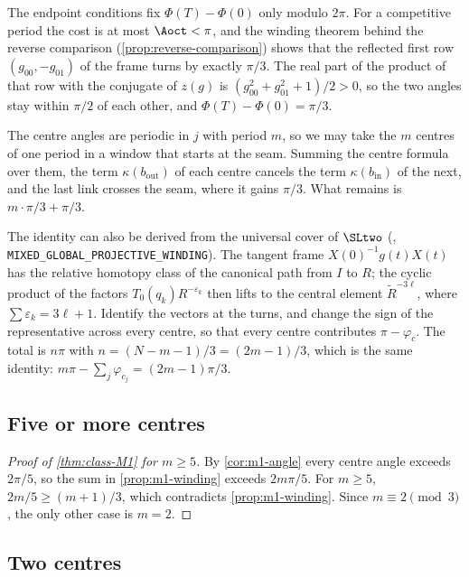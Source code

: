  The endpoint conditions fix $\Phi(T)-\Phi(0)$ only
modulo $2\pi$. For a competitive period the cost is at most $\Aoct<\pi$, and the winding theorem
behind the reverse comparison (\cref{prop:reverse-comparison}) shows that the reflected first row
$(g_{00},-g_{01})$ of the frame turns by exactly $\pi/3$. The real part of the product of that row
with the conjugate of $z(g)$ is $(g_{00}^2+g_{01}^2+1)/2>0$, so the two angles stay within $\pi/2$
of each other, and $\Phi(T)-\Phi(0)=\pi/3$.

 The centre angles are periodic in $j$ with period $m$, so we may take the $m$
centres of one period in a window that starts at the seam. Summing the centre formula over them,
the term $\kappa(b_{\mathrm{out}})$ of each centre cancels the term $\kappa(b_{\mathrm{in}})$ of
the next, and the last link crosses the seam, where it gains $\pi/3$. What remains is
$m\cdot\pi/3+\pi/3$.

\begin{remark}\label{rem:m1-route-winding}
  The identity can also be derived from the universal cover of $\SLtwo$ (\cite{Notes},
  \texttt{MIXED\_GLOBAL\_PROJECTIVE\_WINDING}). The tangent frame $X(0)^{-1}g(t)X(t)$ has the
  relative homotopy class of the canonical path from $I$ to $R$; the cyclic product of the factors
  $T_0(q_k)R^{-\varepsilon_k}$ then lifts to the central element $\widetilde R^{-3\ell}$, where
  $\sum\varepsilon_k=3\ell+1$. Identify the vectors at the turns, and change the sign of the
  representative across every centre, so that every centre contributes $\pi-\varphi_c$. The total
  is $n\pi$ with $n=(N-m-1)/3=(2m-1)/3$, which is the same identity:
  $m\pi-\sum_j\varphi_{c_j}=(2m-1)\pi/3$.
\end{remark}

\subsection{Five or more centres}

\begin{proof}[Proof of \cref{thm:class-M1} for $m\ge5$]
  By \cref{cor:m1-angle} every centre angle exceeds $2\pi/5$, so the sum in
  \cref{prop:m1-winding} exceeds $2m\pi/5$. For $m\ge5$, $2m/5\ge(m+1)/3$, which contradicts
  \cref{prop:m1-winding}. Since $m\equiv2\pmod3$, the only other case is $m=2$.
\end{proof}

\subsection{Two centres}

